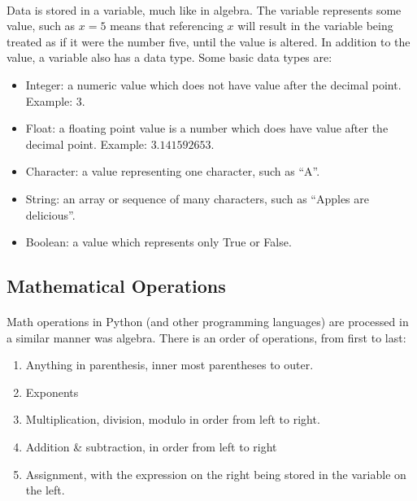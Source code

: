 \documentclass[letter,10pt]{article}
\begin{document}
\paragraph{}Data is stored in a variable, much like in algebra. The variable represents some value, such as $x = 5$ means that referencing $x$ will result in the variable being treated as if it were the number five, until the value is altered. In addition to the value, a variable also has a data type. Some basic data types are:

\begin{itemize}
    \item Integer: a numeric value which does not have value after the decimal point. Example: $3$.
    \item Float: a floating point value is a number which does have value after the decimal point. Example: $3.141592653$.
    \item Character: a value representing one character, such as ``A''.
    \item String: an array or sequence of many characters, such as ``Apples are delicious''.
    \item Boolean: a value which represents only True or False.
\end{itemize}

\FloatBarrier
\subsection{Mathematical Operations}
\paragraph{}Math operations in Python (and other programming languages) are processed in a similar manner was algebra. There is an order of operations, from first to last:

\begin{enumerate}
    \item Anything in parenthesis, inner most parentheses to outer.
    \item Exponents
    \item Multiplication, division, modulo in order from left to right.
    \item Addition \& subtraction, in order from left to right
    \item Assignment, with the expression on the right being stored in the variable on the left.
\end{enumerate}
\end{document}

